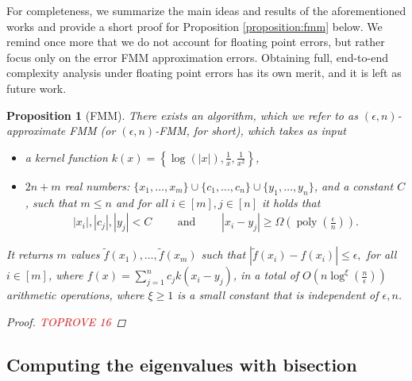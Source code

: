 \documentclass{article}
\newcommand{\labs}{\left|}
\newcommand{\rabs}{\right|}
\newcommand{\lcurly}{\left\{}
\newcommand{\rcurly}{\right\}}
\newcommand{\lpar}{\left(}
\newcommand{\rpar}{\right)}
\newtheorem{proposition}{Proposition}[section]
\DeclareMathOperator{\poly}{poly}
\newcommand{\cfmm}{\xi}
\newcommand{\fmmalgo}{FMM} \usepackage[utf8]{inputenc}
\begin{document}
For completeness, we summarize the main ideas and results of the aforementioned works and provide a short proof for Proposition \ref{proposition:fmm} below.
We remind once more that we do not account for floating point errors, but rather focus only on the error FMM approximation errors. Obtaining full, end-to-end complexity analysis under floating point errors has its own merit, and it is left as future work.
\begin{proposition}[FMM]
    \label{proposition:fmm_appendix}
    There exists an algorithm, which we refer to as $(\epsilon,n)$-approximate FMM (or $(\epsilon,n)$-\fmmalgo, for short), which takes as input 
    \begin{itemize}
        \item a kernel function $k(x)=\lcurly \log(|x|), \frac{1}{x}, \frac{1}{x^2} \rcurly$,
        \item $2n+m$ real numbers: $\{x_1,\ldots,x_m\}\cup \{c_1,\ldots,c_n\}\cup\{y_1,\ldots,y_n\}$, and a constant $C$, such that $m\leq n$ and for all $i\in[m],j\in[n]$ it holds that
        \begin{align*}
            |x_i|,|c_j|,|y_j|<C
            \qquad
            \text{ and }
            \qquad
            |x_i-y_j|\geq \Omega(\poly(\tfrac{\epsilon}{n})).
        \end{align*}
    \end{itemize}
    It returns $m$ values $\widetilde f(x_1),\ldots,\widetilde f(x_m)$ such that
    $
        \labs
            \widetilde f(x_i)-f(x_i)
        \rabs
        \leq \epsilon,
    $
    for all $i\in[m]$, where $f(x) = \sum_{j=1}^n c_j k(x_i-y_j)$,
    in a total of $O\lpar 
        n\log^{\cfmm}(\tfrac{n}{\epsilon})
    \rpar$ arithmetic operations, where $\cfmm\geq 1$ is a small constant that is independent of $\epsilon,n$.
\begin{proof}\textcolor{red}{TOPROVE 16}\end{proof}
\end{proposition}













\subsection{Computing the eigenvalues with bisection}
\end{document}
